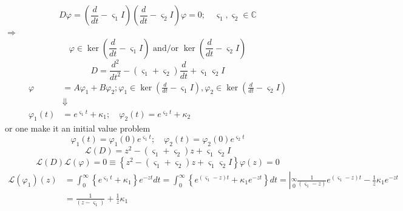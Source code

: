 \documentclass[aps,preprint]{revtex4}%
\begin{document}
\begin{equation}
D\varphi=\left(  \frac{d}{dt}-\varsigma_{1}I\right)  \left(  \frac{d}%
{dt}-\varsigma_{2}I\right)  \varphi=0;\quad\varsigma_{1},\varsigma_{2}%
\in\mathbb{C}%
\end{equation}
$\Rightarrow$%
\begin{equation}
\varphi\in\ker\left(  \frac{d}{dt}-\varsigma_{1}I\right)  \text{ and/or }%
\ker\left(  \frac{d}{dt}-\varsigma_{2}I\right)
\end{equation}%
\begin{equation}
D=\frac{d^{2}}{dt^{2}}-\left(  \varsigma_{1}+\varsigma_{2}\right)  \frac
{d}{dt}+\varsigma_{1}\varsigma_{2}I
\end{equation}%
\begin{align}
\varphi &  =A\varphi_{1}+B\varphi_{2};\varphi_{1}\in\ker\left(  \frac{d}%
{dt}-\varsigma_{1}I\right)  ,\varphi_{2}\in\ker\left(  \frac{d}{dt}%
-\varsigma_{2}I\right)  \\
&  \Downarrow\\
\varphi_{1}\left(  t\right)   &  =e^{\varsigma_{1}t}+\kappa_{1};\quad
\varphi_{2}\left(  t\right)  =e^{\varsigma_{2}t}+\kappa_{2}%
\end{align}
or one make it an initial value problem
\begin{equation}
\varphi_{1}\left(  t\right)  =\varphi_{1}\left(  0\right)  e^{\varsigma_{1}%
t};\quad\varphi_{2}\left(  t\right)  =\varphi_{2}\left(  0\right)
e^{\varsigma_{2}t}%
\end{equation}%
\begin{equation}
\mathcal{L}\left(  D\right)  =z^{2}-\left(  \varsigma_{1}+\varsigma
_{2}\right)  z+\varsigma_{1}\varsigma_{2}I
\end{equation}%
\begin{equation}
\mathcal{L}\left(  D\right)  \mathcal{L}\left(  \varphi\right)  =0\equiv
\left\{  z^{2}-\left(  \varsigma_{1}+\varsigma_{2}\right)  z+\varsigma
_{1}\varsigma_{2}I\right\}  \varphi\left(  z\right)  =0
\end{equation}%
\begin{align}
\mathcal{L}\left(  \varphi_{1}\right)  \left(  z\right)   &  =\int_{0}%
^{\infty}\left\{  e^{\varsigma_{1}t}+\kappa_{1}\right\}  e^{-zt}dt=\int
_{0}^{\infty}\left\{  e^{\left(  \varsigma_{1}-z\right)  t}+\kappa_{1}%
e^{-zt}\right\}  dt=\left\vert \overset{\infty}{\underset{0}{}}\frac
{1}{\left(  \varsigma_{1}-z\right)  }e^{\left(  \varsigma_{1}-z\right)
t}-\frac{1}{z}\kappa_{1}e^{-zt}\right.  \\
&  =\frac{1}{\left(  z-\varsigma_{1}\right)  }+\frac{1}{z}\kappa_{1}%
\end{align}%
\end{document}
